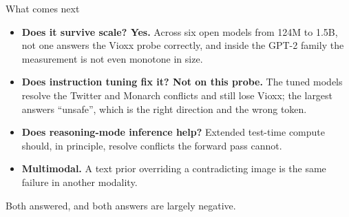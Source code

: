 \documentclass[aspectratio=169]{beamer}
\begin{document}
\begin{frame}{What comes next}
  \begin{itemize}\setlength\itemsep{0.9em}
    \item \textbf{Does it survive scale? Yes.} Across six open models from 124M to
          1.5B, not one answers the Vioxx probe correctly, and inside the GPT-2
          family the measurement is not even monotone in size.
    \item \textbf{Does instruction tuning fix it? Not on this probe.} The tuned
          models resolve the Twitter and Monarch conflicts and still lose Vioxx;
          the largest answers ``unsafe'', which is the right direction and the
          wrong token.
    \item \textbf{Does reasoning-mode inference help?} Extended test-time compute
          should, in principle, resolve conflicts the forward pass cannot.
    \item \textbf{Multimodal.} A text prior overriding a contradicting image is the
          same failure in another modality.
  \end{itemize}
  \vspace{0.5em}
  \begin{center}\color{muted}\small
    Both answered, and both answers are largely negative.
  \end{center}
\end{frame}
\end{document}
